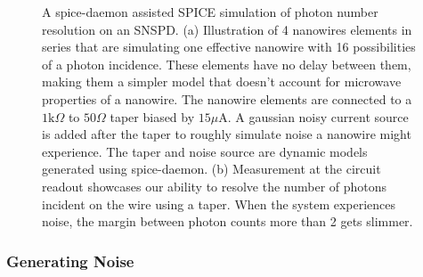 \begin{figure}
    \centering
    \caption{A spice-daemon assisted SPICE simulation of photon number resolution on an SNSPD.
    (a) Illustration of 4 nanowires elements in series that are simulating one 
    effective nanowire with 16
    possibilities of a photon incidence. These elements have no delay between them, making
    them a simpler model that doesn't account for microwave properties of a nanowire.
    The nanowire elements are connected to a $1\mathrm{k}\Omega$ to $50\Omega$ taper
    biased by $15\mu$A. A gaussian noisy current source is added after the taper to
    roughly simulate noise a nanowire might experience.
    The taper and noise source are dynamic models generated using spice-daemon.
    (b) Measurement at the circuit readout showcases our ability to resolve the number of
    photons incident on the wire using a taper. When the system experiences noise, the
    margin between photon counts more than 2 gets slimmer.}
    \label{fig:taper_pnr}
\end{figure}



\subsubsection{Generating Noise} \label{gen_noise}


